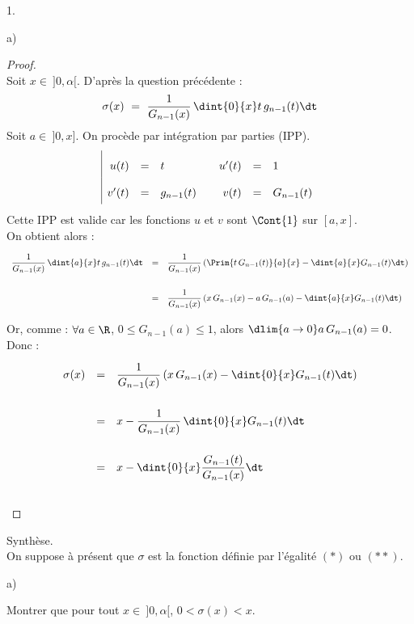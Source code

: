 \documentclass[11pt]{article}%
\begin{document}
\begin{noliste}{1.}
\begin{noliste}{a)}
    \begin{proof}~\\
      Soit $x \in \ ]0,\alpha[$. D'après la question précédente :
      \[
        \sigma(x) \ = \ \dfrac{1}{G_{n-1}(x)} \, \dint{0}{x} t \,
        g_{n-1}(t) \dt
      \]
      Soit $a \in \ ]0, x]$. On procède par intégration par parties 
      (IPP).
      \[
        \renewcommand{\arraystretch}{2}
        \begin{array}{|rcl@{\qquad}rcl}
          u(t) & = & t & u'(t) & = & 1 \\
          v'(t) & = & g_{n-1}(t) & v(t) & = & G_{n-1}(t)
        \end{array}
        \]
      Cette IPP est valide car les fonctions $u$ et $v$ sont 
      $\Cont{1}$ sur $[a, x]$.\\
      On obtient alors :
      \[
        \begin{array}{rcl}
          \dfrac{1}{G_{n-1}(x)} \, \dint{a}{x} t \, g_{n-1}(t) \dt
          & = & \dfrac{1}{G_{n-1}(x)} \left( \Prim{t \, G_{n-1}(t)}
          {a}{x} - \dint{a}{x} G_{n-1}(t) \dt\right)
          \\[.6cm]
          & = & \dfrac{1}{G_{n-1}(x)} \left( x \, G_{n-1}(x) - 
          a \, G_{n-1}(a) - \dint{a}{x} G_{n-1}(t) \dt \right)
        \end{array}
      \]
      
      
      \newpage
      
      
      Or, comme : $\forall a \in \R$, $0 \leq G_{n-1}(a) \leq 1$, alors 
      $\dlim{a \to 0} a \, 
      G_{n-1}(a) =0$. Donc :
      \[
        \begin{array}{rcl}
          \sigma(x) & = & \dfrac{1}{G_{n-1}(x)} \left( x \, G_{n-1}(x)
          - \dint{0}{x} G_{n-1}(t) \dt \right)
          \\[.6cm]
          & = & x - \dfrac{1}{G_{n-1}(x)} \, \dint{0}{x} G_{n-1}(t) \dt
          \\[.6cm]
          & = & x - \dint{0}{x} \dfrac{G_{n-1}(t)}{G_{n-1}(x)} \dt
        \end{array}
      \]
      \conc{$\forall x \in \ ]0,\alpha[$, $\sigma(x) = x - \dint{0}{x}
      \dfrac{G_{n-1}(t)}{G_{n-1}(x)} \dt$}~\\[-1cm]
    \end{proof}
  \end{noliste}
  
  \item Synthèse.\\
  On suppose à présent que $\sigma$ est la fonction définie par 
  l'égalité $(*)$ ou $(**)$.
  \begin{noliste}{a)}
    \setlength{\itemsep}{2mm}
    \item Montrer que pour tout $x \in \ ]0, \alpha[$, $0 < \sigma(x)
    <x$.
    

\end{noliste}
\end{noliste}
\end{document}
